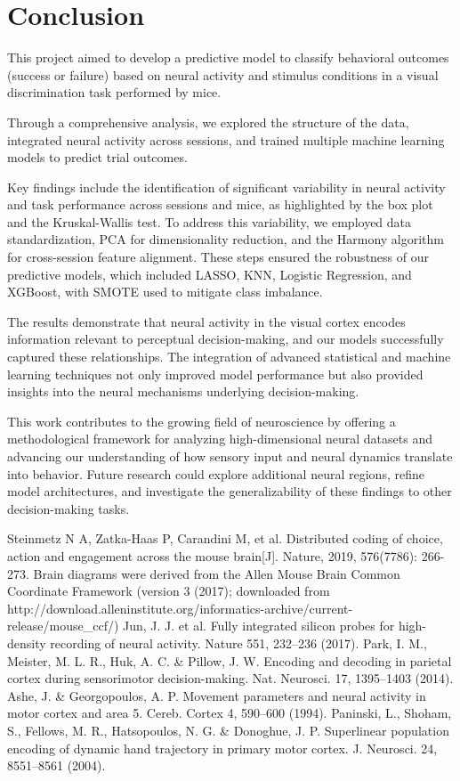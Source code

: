 \documentclass{article}
\begin{document}
	\section{Conclusion}
	\par This project aimed to develop a predictive model to classify behavioral outcomes (success or failure) based on neural activity and stimulus conditions in a visual discrimination task performed by mice. 
	\par Through a comprehensive analysis, we explored the structure of the data, integrated neural activity across sessions, and trained multiple machine learning models to predict trial outcomes.
	\par Key findings include the identification of significant variability in neural activity and task performance across sessions and mice, as highlighted by the box plot and the Kruskal-Wallis test. To address this variability, we employed data standardization, PCA for dimensionality reduction, and the Harmony algorithm for cross-session feature alignment. These steps ensured the robustness of our predictive models, which included LASSO, KNN, Logistic Regression, and XGBoost, with SMOTE used to mitigate class imbalance.
	\par The results demonstrate that neural activity in the visual cortex encodes information relevant to perceptual decision-making, and our models successfully captured these relationships. The integration of advanced statistical and machine learning techniques not only improved model performance but also provided insights into the neural mechanisms underlying decision-making. 
	\par This work contributes to the growing field of neuroscience by offering a methodological framework for analyzing high-dimensional neural datasets and advancing our understanding of how sensory input and neural dynamics translate into behavior. Future research could explore additional neural regions, refine model architectures, and investigate the generalizability of these findings to other decision-making tasks.
	\clearpage
	\begin{thebibliography}{99} 
		 Steinmetz N A, Zatka-Haas P, Carandini M, et al. Distributed coding of choice, action and engagement across the mouse brain[J]. Nature, 2019, 576(7786): 266-273.
		  Brain diagrams were derived from the Allen Mouse Brain Common Coordinate Framework (version 3 (2017); downloaded from http://download.alleninstitute.org/informatics-archive/current-release/mouse\_ccf/)
		 Jun, J. J. et al. Fully integrated silicon probes for high-density recording of neural activity. Nature 551, 232–236 (2017).
		 Park, I. M., Meister, M. L. R., Huk, A. C. \& Pillow, J. W. Encoding and decoding in parietal cortex during sensorimotor decision-making. Nat. Neurosci. 17, 1395–1403 (2014).
		 Ashe, J. \& Georgopoulos, A. P. Movement parameters and neural activity in motor cortex and area 5. Cereb. Cortex 4, 590–600 (1994).
		 Paninski, L., Shoham, S., Fellows, M. R., Hatsopoulos, N. G. \& Donoghue, J. P. Superlinear population encoding of dynamic hand trajectory in primary motor cortex. J. Neurosci. 24, 8551–8561 (2004).
	\end{thebibliography}
	\clearpage
	\appendix
\end{document}
